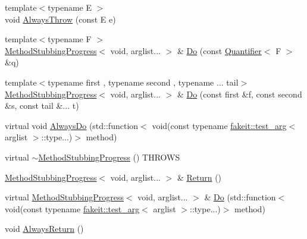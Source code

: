 \begin{DoxyCompactItemize}
\item 
{\footnotesize template$<$typename E $>$ }\\void \mbox{\hyperlink{structfakeit_1_1MethodStubbingProgress_3_01void_00_01arglist_8_8_8_01_4_ad42a19c184f5efba2f997b30f57b9a24}{Always\+Throw}} (const E e)
\item 
{\footnotesize template$<$typename F $>$ }\\\mbox{\hyperlink{structfakeit_1_1MethodStubbingProgress}{Method\+Stubbing\+Progress}}$<$ void, arglist... $>$ \& \mbox{\hyperlink{structfakeit_1_1MethodStubbingProgress_3_01void_00_01arglist_8_8_8_01_4_a3091661d404ffecf2733281471d536c4}{Do}} (const \mbox{\hyperlink{structfakeit_1_1Quantifier}{Quantifier}}$<$ F $>$ \&q)
\item 
{\footnotesize template$<$typename first , typename second , typename ... tail$>$ }\\\mbox{\hyperlink{structfakeit_1_1MethodStubbingProgress}{Method\+Stubbing\+Progress}}$<$ void, arglist... $>$ \& \mbox{\hyperlink{structfakeit_1_1MethodStubbingProgress_3_01void_00_01arglist_8_8_8_01_4_a45b048006587b626f8220aa4b196de2a}{Do}} (const first \&f, const second \&s, const tail \&... t)
\item 
virtual void \mbox{\hyperlink{structfakeit_1_1MethodStubbingProgress_3_01void_00_01arglist_8_8_8_01_4_a3e7ae0c7da9cc0eb29d499b889805eb9}{Always\+Do}} (std\+::function$<$ void(const typename \mbox{\hyperlink{structfakeit_1_1test__arg}{fakeit\+::test\+\_\+arg}}$<$ arglist $>$\+::type...)$>$ method)
\item 
virtual \mbox{\hyperlink{structfakeit_1_1MethodStubbingProgress_3_01void_00_01arglist_8_8_8_01_4_a13f7ed59a8bd8e214f54b4a2946556ac}{$\sim$\+Method\+Stubbing\+Progress}} () T\+H\+R\+O\+WS
\item 
\mbox{\hyperlink{structfakeit_1_1MethodStubbingProgress}{Method\+Stubbing\+Progress}}$<$ void, arglist... $>$ \& \mbox{\hyperlink{structfakeit_1_1MethodStubbingProgress_3_01void_00_01arglist_8_8_8_01_4_ada79edce54db3ffaa88985829f9b5558}{Return}} ()
\item 
virtual \mbox{\hyperlink{structfakeit_1_1MethodStubbingProgress}{Method\+Stubbing\+Progress}}$<$ void, arglist... $>$ \& \mbox{\hyperlink{structfakeit_1_1MethodStubbingProgress_3_01void_00_01arglist_8_8_8_01_4_ae41031c8833fad09c16cbbc89569918b}{Do}} (std\+::function$<$ void(const typename \mbox{\hyperlink{structfakeit_1_1test__arg}{fakeit\+::test\+\_\+arg}}$<$ arglist $>$\+::type...)$>$ method)
\item 
void \mbox{\hyperlink{structfakeit_1_1MethodStubbingProgress_3_01void_00_01arglist_8_8_8_01_4_a750cd97e361c308232871da7c336e53e}{Always\+Return}} ()

\end{DoxyCompactItemize}
